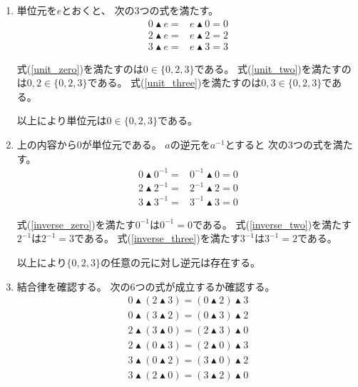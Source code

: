 \documentclass[12pt,b5paper]{ltjsarticle}
\begin{document}
\dotfill

\begin{enumerate}
 \item
      単位元を$e$とおくと、
      次の3つの式を満たす。
      \begin{align}
       0 \blacktriangle e =& e \blacktriangle 0 = 0 \label{unit_zero}\\
       2 \blacktriangle e =& e \blacktriangle 2 = 2 \label{unit_two}\\
       3 \blacktriangle e =& e \blacktriangle 3 = 3 \label{unit_three}
      \end{align}

      式(\ref{unit_zero})を満たすのは$0\in \{0,2,3\}$である。
      式(\ref{unit_two})を満たすのは$0,2\in \{0,2,3\}$である。
      式(\ref{unit_three})を満たすのは$0,3\in \{0,2,3\}$である。

      以上により単位元は$0\in\{0,2,3\}$である。

 \item
      上の内容から$0$が単位元である。
      $a$の逆元を$a^{-1}$とすると
      次の3つの式を満たす。
      \begin{align}
       0 \blacktriangle 0^{-1} =& 0^{-1} \blacktriangle 0 = 0 \label{inverse_zero}\\
       2 \blacktriangle 2^{-1} =& 2^{-1} \blacktriangle 2 = 0 \label{inverse_two}\\
       3 \blacktriangle 3^{-1} =& 3^{-1} \blacktriangle 3 = 0 \label{inverse_three}
      \end{align}

      式(\ref{inverse_zero})を満たす$0^{-1}$は$0^{-1}=0$である。
      式(\ref{inverse_two})を満たす$2^{-1}$は$2^{-1}=3$である。
      式(\ref{inverse_three})を満たす$3^{-1}$は$3^{-1}=2$である。

      以上により$\{0,2,3\}$の任意の元に対し逆元は存在する。

 \item
      結合律を確認する。
      次の6つの式が成立するか確認する。
      \begin{align}
       0 \blacktriangle ( 2 \blacktriangle 3 ) = (0 \blacktriangle  2) \blacktriangle 3 \label{asso023}\\
       0 \blacktriangle ( 3 \blacktriangle 2 ) = (0 \blacktriangle  3) \blacktriangle 2 \label{asso032}\\
       2 \blacktriangle ( 3 \blacktriangle 0 ) = (2 \blacktriangle  3) \blacktriangle 0 \label{asso230}\\
       2 \blacktriangle ( 0 \blacktriangle 3 ) = (2 \blacktriangle  0) \blacktriangle 3 \label{asso203}\\
       3 \blacktriangle ( 0 \blacktriangle 2 ) = (3 \blacktriangle  0) \blacktriangle 2 \label{asso302}\\
       3 \blacktriangle ( 2 \blacktriangle 0 ) = (3 \blacktriangle  2) \blacktriangle 0 \label{asso320}
      \end{align}



\end{enumerate}
\end{document}
